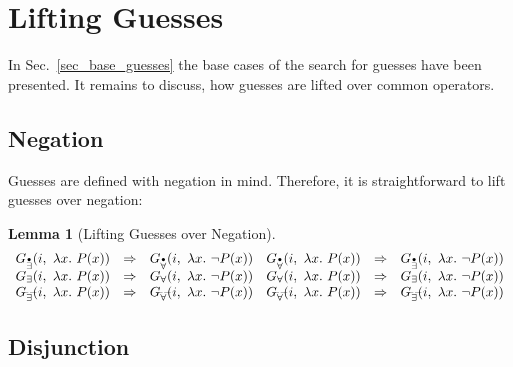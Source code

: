\documentclass[a4paper,12pt,DIV=12,oneside]{scrbook}
\newtheorem{lemma}{Lemma}[section]
\theoremstyle{definition}
\theoremstyle{remark}
\newcommand{\GE}{\ensuremath{G_\exists}}
\newcommand{\GEP}{\ensuremath{G_{\accentset{\bullet}{\exists}}}}
\newcommand{\GEG}{\ensuremath{G_{\accentset{\_\,\_}{\exists}}}}
\newcommand{\GU}{\ensuremath{G_\forall}}
\newcommand{\GUP}{\ensuremath{G_{\accentset{\bullet}{\forall}}}}
\newcommand{\GUG}{\ensuremath{G_{\accentset{\_\,\_}{\forall}}}}
\begin{document}
\section{Lifting Guesses}\label{sec_lifting_guesses}

In Sec.~\ref{sec_base_guesses} the base cases of the search for guesses have been presented.
It remains to discuss, how guesses are lifted over common operators.

\subsection{Negation}
Guesses are defined with negation in mind. Therefore, it is straightforward to lift
guesses over negation:
%
\begin{lemma}[Lifting Guesses over Negation]\label{lemma_guesses_lift_neg}
\[
\begin{array}{lll@{\quad}lll}
\GEP(i,\ \lambda x.\ P(x)) & \Rightarrow & \GUP(i,\ \lambda x.\ \neg P(x)) &
\GUP(i,\ \lambda x.\ P(x)) & \Rightarrow & \GEP(i,\ \lambda x.\ \neg P(x)) \\
\GE(i,\ \lambda x.\ P(x)) & \Rightarrow & \GU(i,\ \lambda x.\ \neg P(x)) &
\GU(i,\ \lambda x.\ P(x)) & \Rightarrow & \GE(i,\ \lambda x.\ \neg P(x)) \\
\GEG(i,\ \lambda x.\ P(x)) & \Rightarrow & \GUG(i,\ \lambda x.\ \neg P(x)) &
\GUG(i,\ \lambda x.\ P(x)) & \Rightarrow & \GEG(i,\ \lambda x.\ \neg P(x))
\end{array}
\]
\end{lemma}

\subsection{Disjunction}
\end{document}

